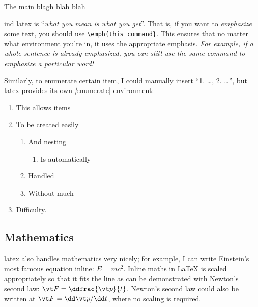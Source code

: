 \documentclass[twoside, onecolumn, bibliography=totoc, parskip=half*]{scrartcl}
\begin{document}
The main blagh blah blah\begin{tiny}
\label{•} 
\end{tiny}ind \gls{latex} is ``\textit{what you mean is what you
  get}''.  That is, if you want to \emph{emphasize} some text, you should use
\verb|\emph{this command}|.  This ensures that no matter what environment you're
in, it uses the appropriate emphasis.  \emph{For example, if a whole sentence is
  already emphasized, you can still use the same command to \emph{emphasize} a
  particular word!}

Similarly, to enumerate certain item, I could manually insert ``1. \dots,
2. \dots'', but \gls{latex} provides its own \emph|{enumerate}| environment:
\begin{enumerate}
\item This allows items
\item To be created easily
  \begin{enumerate}
  \item And nesting
    \begin{enumerate}
    \item Is automatically 
    \end{enumerate}
  \item Handled
  \item Without much
  \end{enumerate}
\item Difficulty.
\end{enumerate}

\subsection{Mathematics}
\label{subsec:mathematics}

\gls{latex} also handles mathematics very nicely; for example, I can write
Einstein's most famous equation inline: \(E = mc^2\).  Inline maths in \LaTeX{}
is scaled appropriately so that it fits the line as can be demonstrated with
Newton's second law: \(\vt F = \ddfrac{\vt p}{t}\).  Newton's second law could
also be written at \(\vt F = \dd \vt p / \dd t\), where no scaling is required.
\end{document}
